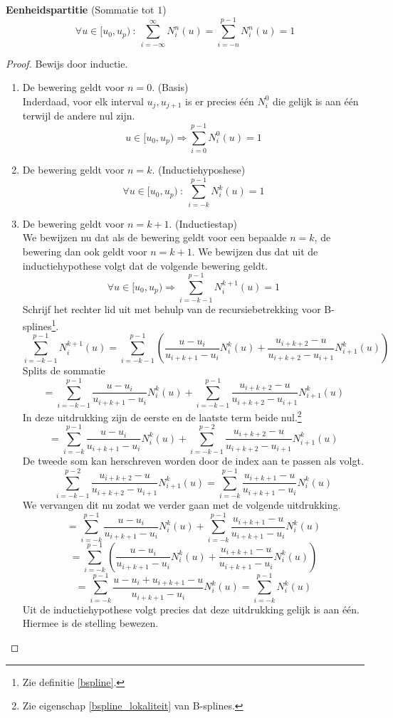 \documentclass[computergesteund_ontwerp_van_curven_en_oppervlakken.tex]{subfiles}
\begin{document}
\begin{ei}
\textbf{Eenheidspartitie} (Sommatie tot $1$)
\label{bspline_eenheidspartitie}
\[
\forall u \in [u_0,u_p)\ :\
\sum_{i=-\infty}^{\infty}N_{i}^{n}(u)
= \sum_{i=-n}^{p-1}N_{i}^{n}(u)
= 1
\]

\begin{proof}Bewijs door inductie.\\
\begin{enumerate}
\item De bewering geldt voor $n=0$. (Basis)\\
Inderdaad, voor elk interval $u_j,u_{j+1}$ is er precies \'e\'en $N_{i}^{0}$ die gelijk is aan \'e\'en terwijl de andere nul zijn.
\[
u \in [u_0,u_p) \Rightarrow
\sum_{i=0}^{p-1}N_{i}^{0}(u)
= 1
\]
\item De bewering geldt voor $n=k$. (Inductiehyposhese)
\[
\forall u \in [u_0,u_p)\ :\
\sum_{i=-k}^{p-1}N_{i}^{k}(u)
= 1
\]
\item De bewering geldt voor $n=k+1$. (Inductiestap)\\
We bewijzen nu dat als de bewering geldt voor een bepaalde $n=k$, de bewering dan ook geldt voor $n=k+1$.
We bewijzen dus dat uit de inductiehypothese volgt dat de volgende bewering geldt.
\[
\forall u \in [u_0,u_p) \Rightarrow
\sum_{i=-k-1}^{p-1}N_{i}^{k+1}(u)
= 1
\]
Schrijf het rechter lid uit met behulp van de recursiebetrekking voor B-splines\footnote{Zie definitie \ref{bspline}.}.
\[
\sum_{i=-k-1}^{p-1}N_{i}^{k+1}(u)
= \sum_{i=-k-1}^{p-1}
\left(
\frac{u-u_i}{u_{i+k+1}-u_i}					N_{i}^{k}(u)
+ \frac{u_{i+k+2}-u}{u_{i+k+2}-u_{i+1}}			N_{i+1}^{k}(u)
\right)
\]
Splits de sommatie
\[
=
\sum_{i=-k-1}^{p-1}
\frac{u-u_i}{u_{i+k+1}-u_i}					N_{i}^{k}(u)
+ 
\sum_{i=-k-1}^{p-1}
\frac{u_{i+k+2}-u}{u_{i+k+2}-u_{i+1}}			N_{i+1}^{k}(u)
\]
In deze uitdrukking zijn de eerste en de laatste term beide nul.\footnote{Zie eigenschap \ref{bspline_lokaliteit} van B-splines.}
\[
=
\sum_{i=-k}^{p-1}
\frac{u-u_i}{u_{i+k+1}-u_i}					N_{i}^{k}(u)
+ 
\sum_{i=-k-1}^{p-2}
\frac{u_{i+k+2}-u}{u_{i+k+2}-u_{i+1}}			N_{i+1}^{k}(u)
\]
De tweede som kan herschreven worden door de index aan te passen als volgt.
\[
\sum_{i=-k-1}^{p-2}
\frac{u_{i+k+2}-u}{u_{i+k+2}-u_{i+1}}			N_{i+1}^{k}(u)
=
\sum_{i=-k}^{p-1}
\frac{u_{i+k+1}-u}{u_{i+k+1}-u_{i}}			N_{i}^{k}(u)
\]
We vervangen dit nu zodat we verder gaan met de volgende uitdrukking.
\[
=
\sum_{i=-k}^{p-1}
\frac{u-u_i}{u_{i+k+1}-u_i}					N_{i}^{k}(u)
+ 
\sum_{i=-k}^{p-1}
\frac{u_{i+k+1}-u}{u_{i+k+1}-u_{i}}			N_{i}^{k}(u)
\]
\[
=
\sum_{i=-k}^{p-1}
\left(
\frac{u-u_i}{u_{i+k+1}-u_i}					N_{i}^{k}(u)
+ 
\frac{u_{i+k+1}-u}{u_{i+k+1}-u_{i}}			N_{i}^{k}(u)
\right)
\]
\[
=
\sum_{i=-k}^{p-1}
\frac{u-u_i + u_{i+k+1}-u}{u_{i+k+1}-u_{i}} N_{i}^{k}(u)
=
\sum_{i=-k}^{p-1}
N_{i}^{k}(u)
\]
Uit de inductiehypothese volgt precies dat deze uitdrukking gelijk is aan \'e\'en. Hiermee is de stelling bewezen.
\end{enumerate}
\end{proof}
\end{ei}
\end{document}
